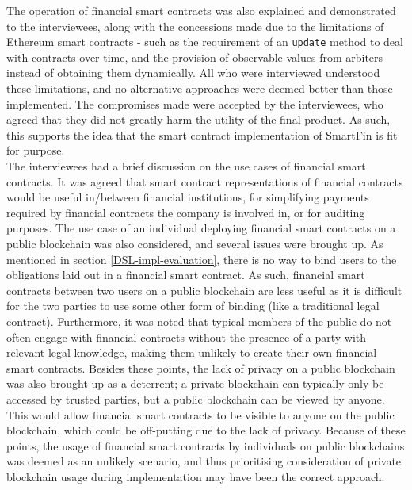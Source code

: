 The operation of financial smart contracts was also explained and demonstrated to the interviewees, along with the concessions made due to the limitations of Ethereum smart contracts - such as the requirement of an \texttt{update} method to deal with contracts over time, and the provision of observable values from arbiters instead of obtaining them dynamically. All who were interviewed understood these limitations, and no alternative approaches were deemed better than those implemented. The compromises made were accepted by the interviewees, who agreed that they did not greatly harm the utility of the final product. As such, this supports the idea that the smart contract implementation of SmartFin is fit for purpose. \\

The interviewees had a brief discussion on the use cases of financial smart contracts. It was agreed that smart contract representations of financial contracts would be useful in/between financial institutions, for simplifying payments required by financial contracts the company is involved in, or for auditing purposes. The use case of an individual deploying financial smart contracts on a public blockchain was also considered, and several issues were brought up. As mentioned in section \ref{DSL-impl-evaluation}, there is no way to bind users to the obligations laid out in a financial smart contract. As such, financial smart contracts between two users on a public blockchain are less useful as it is difficult for the two parties to use some other form of binding (like a traditional legal contract). Furthermore, it was noted that typical members of the public do not often engage with financial contracts without the presence of a party with relevant legal knowledge, making them unlikely to create their own financial smart contracts. Besides these points, the lack of privacy on a public blockchain was also brought up as a deterrent; a private blockchain can typically only be accessed by trusted parties, but a public blockchain can be viewed by anyone. This would allow financial smart contracts to be visible to anyone on the public blockchain, which could be off-putting due to the lack of privacy. Because of these points, the usage of financial smart contracts by individuals on public blockchains was deemed as an unlikely scenario, and thus prioritising consideration of private blockchain usage during implementation may have been the correct approach. \\

